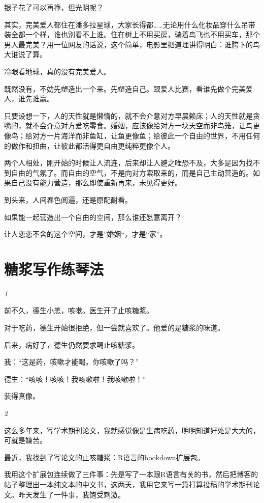 \documentclass[twoside,openright,headings=optiontohead]{ctexbook} %
\begin{document}
{银子花了可以再挣，但光阴呢？

其实，完美爱人都住在潘多拉星球，大家长得都\ldots{}\ldots{}无论用什么化妆品穿什么吊带装全都一个样，谁也别看不上谁。住在树上不用买房，骑着鸟飞也不用买车，那个男人最完美？用一位网友的话说，这个简单，电影里把道理讲得明白：谁胯下的鸟大谁说了算。

冷眼看地球，真的没有完美爱人。

既然没有，不妨先塑造出一个来。先塑造自己。跟爱人比赛，看谁先做个完美爱人，谁先谁赢。

只要设想一下，人的天性就是懒惰的，就不会介意对方早晨赖床；人的天性就是贪嘴的，就不会介意对方爱吃零食。婚姻，应该像给对方一块天空而非鸟笼，让鸟更像鸟；给对方一片海洋而非鱼缸，让鱼更像鱼；给彼此一个自由的世界，不用任何的做作和扭曲，让彼此都活得更自由更纯粹更像个人。

两个人相处，刚开始的时候让人流连，后来却让人避之唯恐不及，大多是因为找不到自由的气氛了。而自由的空气，不是向对方索取来的，而是自己主动营造的。如果自己没有能力营造，那么即使重新再来，未见得更好。

到头来，人间春色阅遍，还是原配耐看。

如果能一起营造出一个自由的空间，那么谁还愿意离开？

让人恋恋不舍的这个空间，才是''婚姻``，才是``家''。

\chapter*{糖浆写作练琴法}\label{bait}

\emph{1}

前不久，德生小恙，咳嗽。医生开了止咳糖浆。

对于吃药，德生开始很拒绝，但一尝就喜欢了。他爱的是糖浆的味道。

后来，病好了，德生仍然要求喝止咳糖浆。

我：``这是药，咳嗽才能喝。你咳嗽了吗？''

德生：``咳咳！咳咳！我咳嗽啦！我咳嗽啦！''

装得真像。

\emph{2}

这么多年来，写学术期刊论文，我就感觉像是生病吃药，明明知道好处是大大的，可就是嫌苦。

最近，我找到了写论文的止咳糖浆：R语言的bookdown扩展包。

我用这个扩展包连续做了三件事：先是写了一本跟R语言有关的书，然后把博客的帖子整理出一本纯文本的中文书，这两天，我用它来写一篇打算投稿的学术期刊论文。昨天发生了一件事，我饱受刺激。

}
\end{document}
